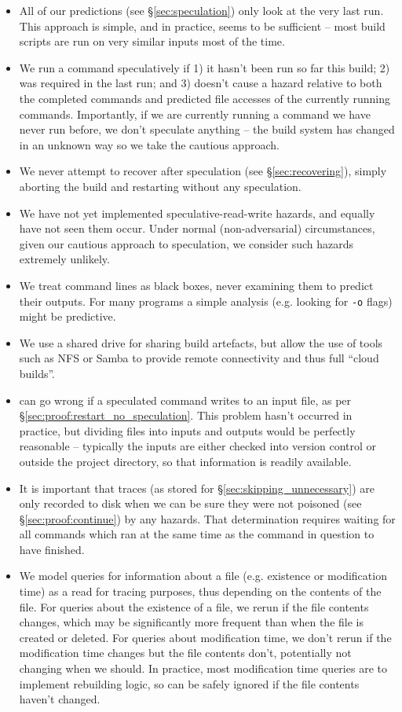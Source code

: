 \begin{itemize}
\item All of our predictions (see \S\ref{sec:speculation}) only look at the very last run. This approach is simple, and in practice, seems to be sufficient -- most build scripts are run on very similar inputs most of the time.
\item We run a command speculatively if 1) it hasn't been run so far this build; 2) was required in the last run; and 3) doesn't cause a hazard relative to both the completed commands and predicted file accesses of the currently running commands. Importantly, if we are currently running a command we have never run before, we don't speculate anything -- the build system has changed in an unknown way so we take the cautious approach.
\item We never attempt to recover after speculation (see \S\ref{sec:recovering}), simply aborting the build and restarting without any speculation.
\item We have not yet implemented speculative-read-write hazards, and equally have not seen them occur. Under normal (non-adversarial) circumstances, given our cautious approach to speculation, we consider such hazards extremely unlikely.
\item We treat command lines as black boxes, never examining them to predict their outputs. For many programs a simple analysis (e.g. looking for \texttt{-o} flags) might be predictive.
\item We use a shared drive for sharing build artefacts, but allow the use of tools such as NFS or Samba to provide remote connectivity and thus full ``cloud builds''.
\item \Rattle can go wrong if a speculated command writes to an input file, as per \S\ref{sec:proof:restart_no_speculation}. This problem hasn't occurred in practice, but dividing files into inputs and outputs would be perfectly reasonable -- typically the inputs are either checked into version control or outside the project directory, so that information is readily available.
\item It is important that traces (as stored for \S\ref{sec:skipping_unnecessary}) are only recorded to disk when we can be sure they were not poisoned (see \S\ref{sec:proof:continue}) by any hazards. That determination requires waiting for all commands which ran at the same time as the command in question to have finished.
\item We model queries for information about a file (e.g. existence or modification time) as a read for tracing purposes, thus depending on the contents of the file. For queries about the existence of a file, we rerun if the file contents changes, which may be significantly more frequent than when the file is created or deleted. For queries about modification time, we don't rerun if the modification time changes but the file contents don't, potentially not changing when we should. In practice, most modification time queries are to implement rebuilding logic, so can be safely ignored if the file contents haven't changed.
\end{itemize}


